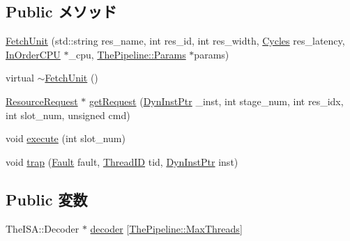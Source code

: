\subsection*{Public メソッド}
\begin{DoxyCompactItemize}
\item 
\hyperlink{classFetchUnit_a75059c82e769a677cc5e29338234493b}{FetchUnit} (std::string res\_\-name, int res\_\-id, int res\_\-width, \hyperlink{classCycles}{Cycles} res\_\-latency, \hyperlink{classInOrderCPU}{InOrderCPU} $\ast$\_\-cpu, \hyperlink{namespaceThePipeline_ab62ca16eeca26566ad2422b5df4943ce}{ThePipeline::Params} $\ast$params)
\item 
virtual \hyperlink{classFetchUnit_a1c06a50150220d7a3cf7acc6e3161c01}{$\sim$FetchUnit} ()
\item 
\hyperlink{classResourceRequest}{ResourceRequest} $\ast$ \hyperlink{classFetchUnit_aae5ce84f94a1057d7f60172daf5d731d}{getRequest} (\hyperlink{classRefCountingPtr}{DynInstPtr} \_\-inst, int stage\_\-num, int res\_\-idx, int slot\_\-num, unsigned cmd)
\item 
void \hyperlink{classFetchUnit_a7b7fff82f8c9cbdb02add1346f60bb9e}{execute} (int slot\_\-num)
\item 
void \hyperlink{classFetchUnit_abf76d6d245f7d3b17d26ea8dcc0cf36f}{trap} (\hyperlink{classRefCountingPtr}{Fault} fault, \hyperlink{base_2types_8hh_ab39b1a4f9dad884694c7a74ed69e6a6b}{ThreadID} tid, \hyperlink{classRefCountingPtr}{DynInstPtr} inst)
\end{DoxyCompactItemize}
\subsection*{Public 変数}
\begin{DoxyCompactItemize}
\item 
TheISA::Decoder $\ast$ \hyperlink{classFetchUnit_a5f15f1b871b77f550632262df3bce5f1}{decoder} \mbox{[}\hyperlink{namespaceThePipeline_ac9c0bbe9cf27d93e08ea8ccc4096e633}{ThePipeline::MaxThreads}\mbox{]}
\end{DoxyCompactItemize}
